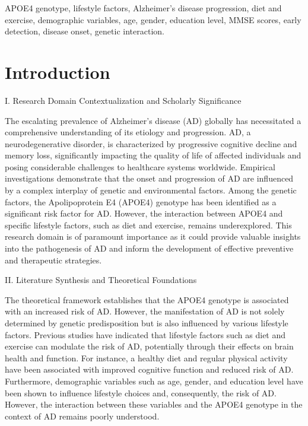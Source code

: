 \documentclass[conference]{IEEEtran}
\begin{document}
\begin{IEEEkeywords}
APOE4 genotype, lifestyle factors, Alzheimer's disease progression, diet and exercise, demographic variables, age, gender, education level, MMSE scores, early detection, disease onset, genetic interaction.
\end{IEEEkeywords}

\section{Introduction}
I. Research Domain Contextualization and Scholarly Significance

The escalating prevalence of Alzheimer's disease (AD) globally has necessitated a comprehensive understanding of its etiology and progression. AD, a neurodegenerative disorder, is characterized by progressive cognitive decline and memory loss, significantly impacting the quality of life of affected individuals and posing considerable challenges to healthcare systems worldwide. Empirical investigations demonstrate that the onset and progression of AD are influenced by a complex interplay of genetic and environmental factors. Among the genetic factors, the Apolipoprotein E4 (APOE4) genotype has been identified as a significant risk factor for AD. However, the interaction between APOE4 and specific lifestyle factors, such as diet and exercise, remains underexplored. This research domain is of paramount importance as it could provide valuable insights into the pathogenesis of AD and inform the development of effective preventive and therapeutic strategies.

II. Literature Synthesis and Theoretical Foundations

The theoretical framework establishes that the APOE4 genotype is associated with an increased risk of AD. However, the manifestation of AD is not solely determined by genetic predisposition but is also influenced by various lifestyle factors. Previous studies have indicated that lifestyle factors such as diet and exercise can modulate the risk of AD, potentially through their effects on brain health and function. For instance, a healthy diet and regular physical activity have been associated with improved cognitive function and reduced risk of AD. Furthermore, demographic variables such as age, gender, and education level have been shown to influence lifestyle choices and, consequently, the risk of AD. However, the interaction between these variables and the APOE4 genotype in the context of AD remains poorly understood.
\end{document}
